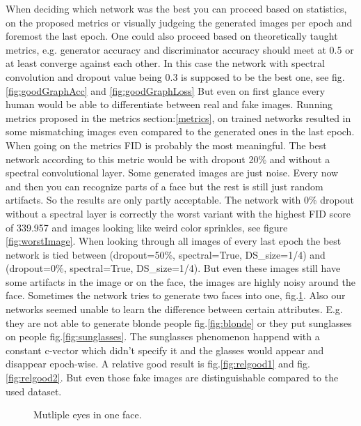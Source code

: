 \documentclass[12pt, a4paper]{article}
\begin{document}
When deciding which network was the best you can proceed based on statistics, on the proposed metrics or visually judgeing the generated images per epoch and foremost the last epoch. 
One could also proceed based on theoretically taught metrics, e.g. generator accuracy and discriminator accuracy should meet at 0.5 or at least converge against each other. In this case the network with spectral convolution and dropout 
value being 0.3 is supposed to be the best one, see fig.\ref{fig:goodGraphAcc} and \ref{fig:goodGraphLoss} But even on first glance every human would be able to differentiate between real and fake images.
Running metrics proposed in the metrics section:\ref{metrics}, on trained networks resulted in some mismatching images even compared to the generated ones in the last epoch. When going on the metrics FID is probably the most meaningful. The best network according to this metric would be with dropout 20\% and without a spectral convolutional layer. Some generated images are just noise. Every now and then you can recognize parts of a face but the rest is still just random artifacts. So the results are only partly acceptable. The network with 0\% dropout without a spectral layer is correctly the worst variant with the highest FID score of 339.957 and images looking like weird color sprinkles, see figure \ref{fig:worstImage}.
When looking through all images of every last epoch the best network is tied between (dropout=50\%, spectral=True, DS\_size=1/4) and (dropout=0\%, spectral=True, DS\_size=1/4). But even these images still have some artifacts in the image or on the face, the images are highly noisy around the face. 
Sometimes the network tries to generate two faces into one, fig.\ref{fig:twoFacesInOne}. 
Also our networks seemed unable to learn the difference between certain attributes. 
E.g. they are not able to generate blonde people fig.\ref{fig:blonde} or they put sunglasses on people fig.\ref{fig:sunglasses}. The sunglasses phenomenon happend with a constant c-vector which didn't specify it and the glasses would appear and disappear epoch-wise.
A relative good result is fig.\ref{fig:relgood1} and fig.\ref{fig:relgood2}. But even those fake images are distinguishable compared to the used dataset.
\begin{figure}
    \caption{Mutliple eyes in one face.}
    \label{fig:twoFacesInOne}
\end{figure}
\end{document}
